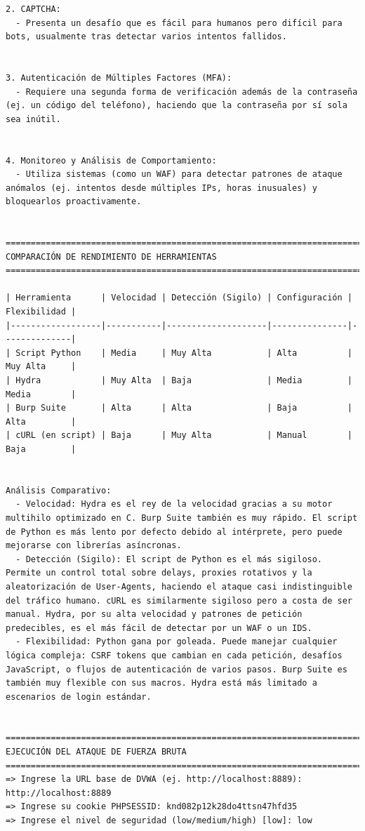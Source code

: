 \documentclass[letter,12pt]{article}
\begin{document}
\begin{verbatim}
2. CAPTCHA:
  - Presenta un desafío que es fácil para humanos pero difícil para bots, usualmente tras detectar varios intentos fallidos.


3. Autenticación de Múltiples Factores (MFA):
  - Requiere una segunda forma de verificación además de la contraseña (ej. un código del teléfono), haciendo que la contraseña por sí sola sea inútil.


4. Monitoreo y Análisis de Comportamiento:
  - Utiliza sistemas (como un WAF) para detectar patrones de ataque anómalos (ej. intentos desde múltiples IPs, horas inusuales) y bloquearlos proactivamente.


================================================================================
COMPARACIÓN DE RENDIMIENTO DE HERRAMIENTAS
================================================================================

| Herramienta      | Velocidad | Detección (Sigilo) | Configuración | Flexibilidad |
|------------------|-----------|--------------------|---------------|--------------|
| Script Python    | Media     | Muy Alta           | Alta          | Muy Alta     |
| Hydra            | Muy Alta  | Baja               | Media         | Media        |
| Burp Suite       | Alta      | Alta               | Baja          | Alta         |
| cURL (en script) | Baja      | Muy Alta           | Manual        | Baja         |
    

Análisis Comparativo:
  - Velocidad: Hydra es el rey de la velocidad gracias a su motor multihilo optimizado en C. Burp Suite también es muy rápido. El script de Python es más lento por defecto debido al intérprete, pero puede mejorarse con librerías asíncronas.
  - Detección (Sigilo): El script de Python es el más sigiloso. Permite un control total sobre delays, proxies rotativos y la aleatorización de User-Agents, haciendo el ataque casi indistinguible del tráfico humano. cURL es similarmente sigiloso pero a costa de ser manual. Hydra, por su alta velocidad y patrones de petición predecibles, es el más fácil de detectar por un WAF o un IDS.
  - Flexibilidad: Python gana por goleada. Puede manejar cualquier lógica compleja: CSRF tokens que cambian en cada petición, desafíos JavaScript, o flujos de autenticación de varios pasos. Burp Suite es también muy flexible con sus macros. Hydra está más limitado a escenarios de login estándar.
    

================================================================================
EJECUCIÓN DEL ATAQUE DE FUERZA BRUTA
================================================================================
=> Ingrese la URL base de DVWA (ej. http://localhost:8889): http://localhost:8889
=> Ingrese su cookie PHPSESSID: knd082p12k28do4ttsn47hfd35
=> Ingrese el nivel de seguridad (low/medium/high) [low]: low


\end{verbatim}
\end{document}
